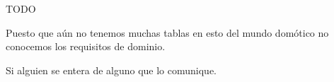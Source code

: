 TODO

Puesto que aún no tenemos muchas tablas en esto del mundo domótico no conocemos los requisitos de dominio.

Si alguien se entera de alguno que lo comunique.
